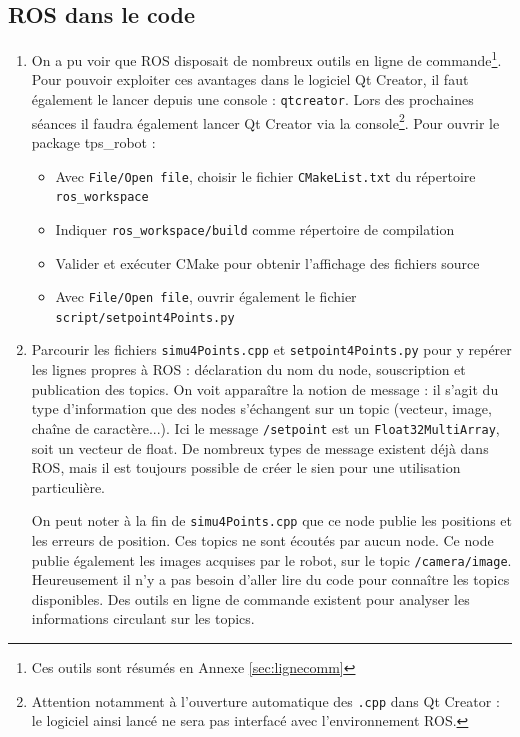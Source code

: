 \documentclass[12pt,a4paper]{article}
\begin{document}
\subsection{ROS dans le code}
\begin{enumerate}
\item On a pu voir que ROS disposait de nombreux outils en ligne de commande\footnote{ Ces outils sont résumés en Annexe \ref{sec:lignecomm}}.
Pour pouvoir exploiter ces avantages dans le logiciel Qt Creator, il faut également le lancer depuis une console : \texttt{qtcreator}.
Lors des prochaines séances il faudra également lancer Qt Creator via la console\footnote{ Attention notamment à l'ouverture automatique des \texttt{.cpp} dans Qt Creator : le logiciel ainsi lancé ne sera pas interfacé avec l'environnement ROS.}.
Pour ouvrir le package tps\_robot :
\begin{itemize}
\item Avec \texttt{File/Open file}, choisir le fichier \texttt{CMakeList.txt} du répertoire \texttt{ros\_workspace}
 \item Indiquer \texttt{ros\_workspace/build} comme répertoire de compilation
 \item Valider et exécuter CMake pour obtenir l'affichage des fichiers source
 \item Avec \texttt{File/Open file}, ouvrir également le fichier \texttt{script/setpoint4Points.py}
\end{itemize}
\item Parcourir les fichiers \texttt{simu4Points.cpp} et \texttt{setpoint4Points.py} pour y repérer les lignes propres à ROS : déclaration du nom du node, souscription et publication des topics. On voit apparaître la notion de message : il s'agit du type d'information que des nodes s'échangent sur un topic (vecteur, image, chaîne de caractère...). Ici le message \texttt{/setpoint} est un \texttt{Float32MultiArray}, soit un vecteur de float. De nombreux types de message existent déjà dans ROS, mais il est toujours possible de créer le sien pour une utilisation particulière.

On peut noter à la fin de \texttt{simu4Points.cpp} que ce node publie les positions et les erreurs de position. Ces topics ne sont écoutés par aucun node. 
Ce node publie également les images acquises par le robot, sur le topic \texttt{/camera/image}. 
Heureusement il n'y a pas besoin d'aller lire du code pour connaître les topics disponibles.
Des outils en ligne de commande existent pour analyser les informations circulant sur les topics.

\end{enumerate}
\end{document}
